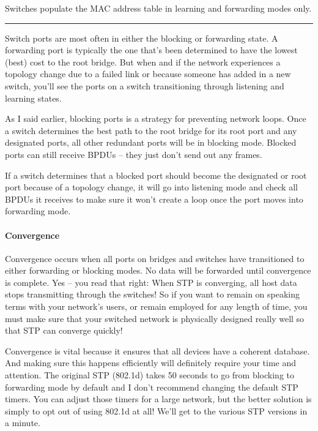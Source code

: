 Switches populate the MAC address table
in learning and forwarding modes only.

\begin{center}\rule{0.5\linewidth}{0.5pt}\end{center}

Switch ports are most often in either the blocking or forwarding state.
A forwarding port is typically the one that's been determined to have
the lowest (best) cost to the root bridge. But when and if the network
experiences a topology change due to a failed link or because someone
has added in a new switch, you'll see the ports on a switch
transitioning through listening and learning states.

As I said earlier, blocking ports is a strategy for preventing network
loops. Once a switch determines the best path to the root bridge for its
root port and any designated ports, all other redundant ports will be in
blocking mode. Blocked ports can still receive BPDUs -- they just don't
send out any frames.

If a switch determines that a blocked port should become the designated
or root port because of a topology change, it will go into listening
mode and check all BPDUs it receives to make sure it won't create a loop
once the port moves into forwarding mode.

\paragraph{Convergence}

Convergence occurs when all ports on bridges and switches have
transitioned to either forwarding or blocking modes. No data will be
forwarded until convergence is complete. Yes -- you read that right: When
STP is converging, all host data stops transmitting through the
switches! So if you want to remain on speaking terms with your network's
users, or remain employed for any length of time, you must make sure
that your switched network is physically designed really well so that
STP can converge quickly!

Convergence is vital because it ensures that all devices have a coherent
database. And making sure this happens efficiently will definitely
require your time and attention. The original STP (802.1d) takes 50
seconds to go from blocking to forwarding mode by default and I don't
recommend changing the default STP timers. You can adjust those timers
for a large network, but the better solution is simply to opt out of
using 802.1d at all! We'll get to the various STP versions in a minute.


